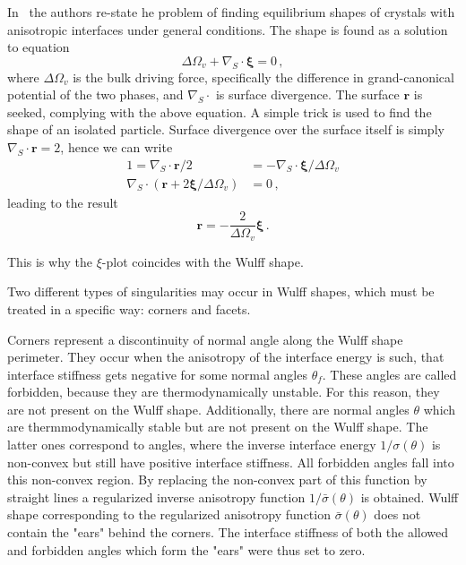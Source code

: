 In~\cite{Cahn1974} the authors re-state he problem of finding equilibrium shapes of crystals with anisotropic interfaces under general conditions. The shape is found as a solution to equation
\begin{equation} \label{eq_xivec_equilibrium_shape}
    \Delta\Omega_v + \nabla_S\cdot \bm{\xi} = 0 \,,
\end{equation}
where $\Delta\Omega_v$ is the bulk driving force, specifically the difference in grand-canonical potential of the two phases, and $\nabla_S\cdot$ is surface divergence. The surface $\bm{r}$ is seeked, complying with the above equation. A simple trick is used to find the shape of an isolated particle. Surface divergence over the surface itself is simply $\nabla_S\cdot\bm{r}=2$, hence we can write
\begin{align}
    1 = \nabla_S\cdot\bm{r}/2 &= -\nabla_S\cdot\bm{\xi}/\Delta\Omega_v \\
     \nabla_S\cdot(\bm{r} +2\bm{\xi}/\Delta\Omega_v) &=0 \,,
\end{align}
leading to the result
\begin{equation}
    \bm{r} = -\frac{2}{\Delta\Omega_v}\bm{\xi} \,.
\end{equation}

This is why the $\xi$-plot coincides with the Wulff shape.

Two different types of singularities may occur in Wulff shapes, which must be treated in a specific way: corners and facets. 

Corners represent a discontinuity of normal angle along the Wulff shape perimeter. They occur when the anisotropy of the interface energy is such, that interface stiffness gets negative for some normal angles $\theta_f$. These angles are called forbidden, because they are thermodynamically unstable. For this reason, they are not present on the Wulff shape. Additionally, there are normal angles $\theta$ which are thermmodynamically stable but are not present on the Wulff shape. The latter ones correspond to angles, where the inverse interface energy $1/\sigma(\theta)$ is non-convex but still have positive interface stiffness. All forbidden angles fall into this non-convex region. By replacing the non-convex part of this function by straight lines a regularized inverse anisotropy function $1/\bar{\sigma}(\theta)$ is obtained. Wulff shape corresponding to the regularized anisotropy function $\bar{\sigma}(\theta)$ does not contain the "ears" behind the corners. The interface stiffness of both the allowed and forbidden angles which form the "ears" were thus set to zero.


